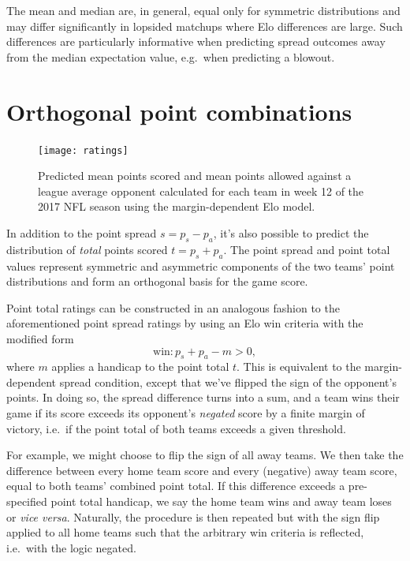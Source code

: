 \documentclass[aps,prc,reprint,amsmath,superscriptaddress,nofootinbib]{revtex4-1}
\begin{document}
The mean and median are, in general, equal only for symmetric distributions and may differ significantly in lopsided matchups where Elo differences are large.
Such differences are particularly informative when predicting spread outcomes away from the median expectation value, e.g.\ when predicting a blowout. 

\section{Orthogonal point combinations}

\begin{figure}
  \texttt{[image: ratings]}
  \caption{\label{fig:ratings} Predicted mean points scored and mean points allowed against a league average opponent calculated for each team in week 12 of the 2017 NFL season using the margin-dependent Elo model.}
\end{figure}

In addition to the point spread $s = p_s - p_a$, it's also possible to predict the distribution of \emph{total} points scored $t = p_s + p_a$.
The point spread and point total values represent symmetric and asymmetric components of the two teams' point distributions and form an orthogonal basis for the game score. 

Point total ratings can be constructed in an analogous fashion to the aforementioned point spread ratings by using an Elo win criteria with the modified form
\begin{equation}
  \label{win_total}
  \text{win}: p_s + p_a - m > 0,
\end{equation}
where $m$ applies a handicap to the point total $t$.
This is equivalent to the margin-dependent spread condition, except that we've flipped the sign of the opponent's points.
In doing so, the spread difference turns into a sum, and a team wins their game if its score exceeds its opponent's \emph{negated} score by a finite margin of victory, i.e.\ if the point total of both teams exceeds a given threshold.

For example, we might choose to flip the sign of all away teams.
We then take the difference between every home team score and every (negative) away team score, equal to both teams' combined point total.
If this difference exceeds a pre-specified point total handicap, we say the home team wins and away team loses or \emph{vice versa}.
Naturally, the procedure is then repeated but with the sign flip applied to all home teams such that the arbitrary win criteria is reflected, i.e.\ with the logic negated.
\end{document}
